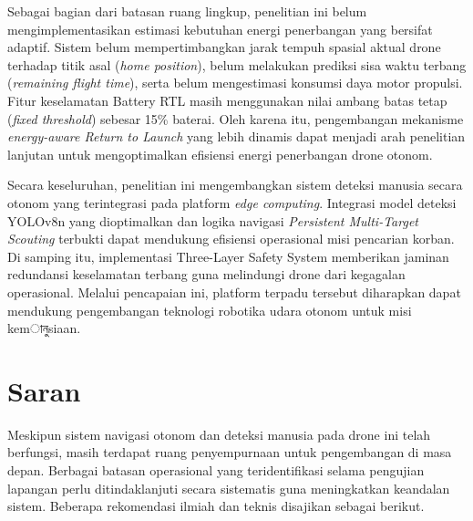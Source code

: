 Sebagai bagian dari batasan ruang lingkup, penelitian ini belum mengimplementasikan estimasi kebutuhan energi penerbangan yang bersifat adaptif. Sistem belum mempertimbangkan jarak tempuh spasial aktual drone terhadap titik asal (\textit{home position}), belum melakukan prediksi sisa waktu terbang (\textit{remaining flight time}), serta belum mengestimasi konsumsi daya motor propulsi. Fitur keselamatan Battery RTL masih menggunakan nilai ambang batas tetap (\textit{fixed threshold}) sebesar 15\% baterai. Oleh karena itu, pengembangan mekanisme \textit{energy-aware Return to Launch} yang lebih dinamis dapat menjadi arah penelitian lanjutan untuk mengoptimalkan efisiensi energi penerbangan drone otonom.

Secara keseluruhan, penelitian ini mengembangkan sistem deteksi manusia secara otonom yang terintegrasi pada platform \textit{edge computing}. Integrasi model deteksi YOLOv8n yang dioptimalkan dan logika navigasi \textit{Persistent Multi-Target Scouting} terbukti dapat mendukung efisiensi operasional misi pencarian korban. Di samping itu, implementasi Three-Layer Safety System memberikan jaminan redundansi keselamatan terbang guna melindungi drone dari kegagalan operasional. Melalui pencapaian ini, platform terpadu tersebut diharapkan dapat mendukung pengembangan teknologi robotika udara otonom untuk misi kemানুsiaan.

\section{Saran}
\label{sec:sec5_saran}
\vspace{1ex}

Meskipun sistem navigasi otonom dan deteksi manusia pada drone ini telah berfungsi, masih terdapat ruang penyempurnaan untuk pengembangan di masa depan. Berbagai batasan operasional yang teridentifikasi selama pengujian lapangan perlu ditindaklanjuti secara sistematis guna meningkatkan keandalan sistem. Beberapa rekomendasi ilmiah dan teknis disajikan sebagai berikut.

